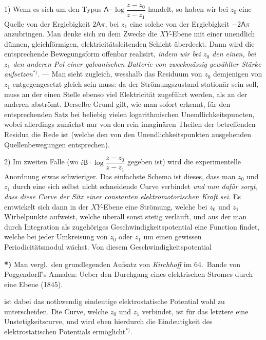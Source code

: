 \documentclass{article}
\begin{document}
1) Wenn es sich um den Typus $\mathsf{A} \cdot \log \dfrac{z - z_{0}}{z - z_{1}}$ handelt, so haben wir bei $z_{0}$ eine Quelle von der Ergiebigkeit $2\mathsf{A}\pi$, bei $z_{1}$ eine solche von der Ergiebigkeit $-2\mathsf{A}\pi$ anzubringen. Man denke sich zu dem Zwecke die $XY$-Ebene mit einer unendlich dünnen, gleichförmigen, elektricitätsleitenden Schicht überdeckt. Dann wird die entsprechende Bewegungsform offenbar realisirt, \emph{indem wir bei $z_{0}$ den einen, bei $z_{1}$ den anderen Pol einer galvanischen Batterie von zweckmässig gewählter Stärke aufsetzen}${}^{*)}$. --- Man sieht zugleich, wesshalb das Residuum von $z_{0}$ demjenigen von $z_{1}$ entgegengesetzt gleich sein muss: da der Strömungszustand stationär sein soll, muss an der einen Stelle ebenso viel Elektricität zugeführt werden, als an der anderen abströmt. Derselbe Grund gilt, wie man sofort erkennt, für den entsprechenden Satz bei beliebig vielen logarithmischen Unendlichkeitspuncten, wobei allerdings zunächst nur von den rein imaginären Theilen der betreffenden Residua die Rede ist (welche den von den Unendlichkeitspunkten ausgehenden Quellenbewegungen entsprechen).

2) Im zweiten Falle (wo $i\mathsf{B} \cdot \log \dfrac{z - z_{0}}{z - z_{1}}$ gegeben ist) wird die experimentelle Anordnung etwas schwieriger. Das einfachste Schema ist dieses, dass man $z_{0}$ und $z_{1}$ durch eine sich selbst nicht schneidende Curve verbindet \emph{und nun dafür sorgt, dass diese Curve der Sitz einer constanten elektromotorischen Kraft sei}. Es entwickelt sich dann in der $XY$-Ebene eine Strömung, welche bei $z_{0}$ und $z_{1}$ Wirbelpunkte aufweist, welche überall sonst stetig verläuft, und aus der man durch Integration als zugehöriges Geschwindigkeitspotential eine Function findet, welche bei jeder Umkreisung von $z_{0}$ oder $z_{1}$ um einen gewissen Periodicitätsmodul wächst. Von diesem Geschwindigkeitspotential

\textbf{*)} Man vergl.\ den grundlegenden Aufsatz von \emph{Kirchhoff} im 64.\ Bande von Poggendorff's Annalen: Ueber den Durchgang eines elektrischen Stromes durch eine Ebene (1845).

ist dabei das nothwendig eindeutige elektrostatische Potential wohl zu unterscheiden. Die Curve, welche $z_{0}$ und $z_{1}$ verbindet, ist für das letztere eine Unstetigkeitscurve, und wird eben hierdurch die Eindeutigkeit des elektrostatischen Potentials ermöglicht${}^{*)}$.

\end{document}
